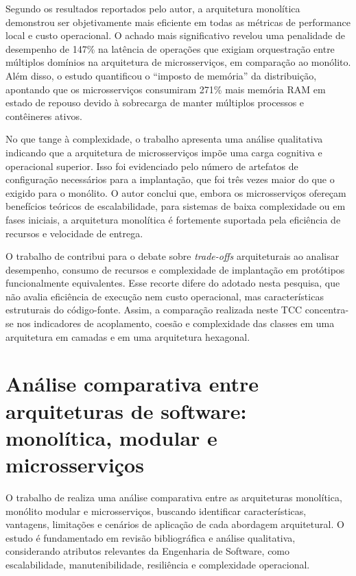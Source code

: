 Segundo os resultados reportados pelo autor, a arquitetura monolítica demonstrou ser objetivamente mais eficiente em todas as métricas de
performance local e custo operacional. O achado mais significativo revelou uma penalidade de desempenho de 147\% na latência de operações 
que exigiam orquestração entre múltiplos domínios na arquitetura de microsserviços, em comparação ao monólito. Além disso, o estudo 
quantificou o ``imposto de memória'' da distribuição, apontando que os microsserviços consumiram 271\% mais memória RAM em estado de repouso 
devido à sobrecarga de manter múltiplos processos e contêineres ativos.

No que tange à complexidade, o trabalho apresenta uma análise qualitativa indicando que a arquitetura de microsserviços impõe uma 
carga cognitiva e operacional superior. Isso foi evidenciado pelo número de artefatos de configuração necessários para a implantação, 
que foi três vezes maior do que o exigido para o monólito. O autor conclui que, embora os microsserviços ofereçam benefícios teóricos 
de escalabilidade, para sistemas de baixa complexidade ou em fases iniciais, a arquitetura monolítica é fortemente suportada pela eficiência
de recursos e velocidade de entrega.

O trabalho de  contribui para o debate sobre \textit{trade-offs} arquiteturais ao analisar desempenho, consumo 
de recursos e complexidade de implantação em protótipos funcionalmente equivalentes. Esse recorte difere do adotado nesta pesquisa, 
que não avalia eficiência de execução nem custo operacional, mas características estruturais do código-fonte. Assim, a comparação 
realizada neste TCC concentra-se nos indicadores de acoplamento, coesão e complexidade das classes em uma arquitetura em camadas e 
em uma arquitetura hexagonal.

\section{Análise comparativa entre arquiteturas de software: monolítica, modular e microsserviços}
\label{sec:analise-comparativa-entre-arquiteturas-de-software-monolitica-modular-e-microsservicos}

O trabalho de  realiza uma análise comparativa entre as arquiteturas monolítica, monólito modular 
e microsserviços, buscando identificar características, vantagens, limitações e cenários de aplicação de cada abordagem arquitetural. 
O estudo é fundamentado em revisão bibliográfica e análise qualitativa, considerando atributos relevantes da Engenharia de Software, 
como escalabilidade, manutenibilidade, resiliência e complexidade operacional.

